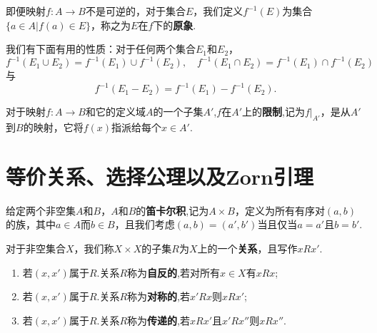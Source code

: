 \documentclass[lang=cn,newtx,10pt,scheme=chinese]{../Template/elegantbook}
\begin{document}
\begin{definition}[原象]\label{definition:原象的定义}
  即便映射\(f:A\to B\)不是可逆的，对于集合\(E\)，我们定义\(f^{-1}(E)\)为集合\(\{a\in A|f(a)\in E\}\)，称之为\(E\)在\(f\)下的\textbf{原象}.
\end{definition}

\begin{proposition}[原像的性质]\label{proposition:原像的性质}
  我们有下面有用的性质：对于任何两个集合\(E_1\)和\(E_2\)，
\[
f^{-1}(E_1\cup E_2)=f^{-1}(E_1)\cup f^{-1}(E_2),\quad f^{-1}(E_1\cap E_2)=f^{-1}(E_1)\cap f^{-1}(E_2)
\]
与
\[
f^{-1}(E_1- E_2)=f^{-1}(E_1)- f^{-1}(E_2).
\]
\end{proposition}

\begin{definition}[映射的限制]\label{definition:映射的限制}
  对于映射\(f:A\to B\)和它的定义域\(A\)的一个子集\(A'\),\(f\)在\(A'\)上的\textbf{限制},记为\(f|_{A'}\)，是从\(A'\)到\(B\)的映射，它将\(f(x)\)指派给每个\(x\in A'\).
\end{definition}



\section{等价关系、选择公理以及Zorn引理}

\begin{definition}[笛卡尔积]\label{}
  给定两个非空集\(A\)和\(B\)，\(A\)和\(B\)的\textbf{笛卡尔积},记为\(A\times B\)，定义为所有有序对\((a, b)\)的族，其中\(a\in A\)而\(b\in B\)，且我们考虑\((a, b)=(a', b')\)当且仅当\(a = a'\)且\(b = b'\).
\end{definition}

\begin{definition}\label{definition:关系及其自反性、对称性、传递性}
  对于非空集合\(X\)，我们称\(X\times X\)的子集\(R\)为\(X\)上的一个\textbf{关系}，且写作\(xRx'\).
  \begin{enumerate}
    \item 若\((x, x')\)属于\(R\).关系\(R\)称为\textbf{自反的},若对所有\(x\in X\)有\(xRx\);

    \item 若\((x, x')\)属于\(R\).关系\(R\)称为\textbf{对称的},若\(x'Rx\)则\(xRx'\);
    
    \item 若\((x, x')\)属于\(R\).关系\(R\)称为\textbf{传递的},若\(xRx'\)且\(x'Rx''\)则\(xRx''\).  
  \end{enumerate}
\end{definition}
\end{document}
